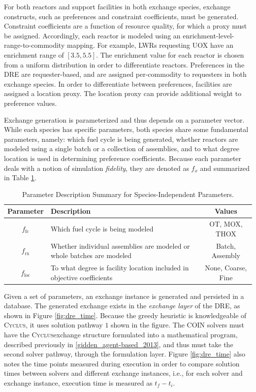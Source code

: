 \documentclass{anstrans}
\newcommand{\Cyclus}{\textsc{Cyclus}}
\newcommand{\ffc}{$f_{\text{fc}}$}
\newcommand{\frx}{$f_{\text{rx}}$}
\newcommand{\floc}{$f_{\text{loc}}$}
\begin{document}
For both reactors and support facilities in both exchange species, exchange
constructs, such as preferences and constraint coefficients, must be
generated. Constraint coefficients are a function of resource quality, for which
a proxy must be assigned. Accordingly, each reactor is modeled using an
enrichment-level-range-to-commodity mapping. For example, LWRs requesting UOX
have an enrichment range of $[3.5, 5.5]$. The enrichment value for each reactor
is chosen from a uniform distribution in order to differentiate
reactors. Preferences in the DRE are requester-based, and are assigned
per-commodity to requesters in both exchange species. In order to differentiate
between preferences, facilities are assigned a location proxy. The location
proxy can provide additional weight to preference values.

Exchange generation is parameterized and thus depends on a parameter
vector. While each species has specific parameters, both species share some
fundamental parameters, namely: which fuel cycle is being generated, whether
reactors are modeled using a single batch or a collection of assemblies, and to
what degree location is used in determining preference coefficients. Because
each parameter deals with a notion of simulation \textit{fidelity}, they are
denoted as $f_{x}$ and summarized in Table \ref{tbl:global_params}.

\begin{table}[h!]
\centering
\caption{Parameter Description Summary for Species-Independent Parameters.}
\label{tbl:global_params}
\begin{tabularx}{\columnwidth}{|c|X|c|} %
\hline
Parameter    & 
Description & 
Values
\\ \hline
\ffc      &
Which fuel cycle is being modeled &
OT, MOX, THOX
\\ \hline
\frx    &
Whether individual assemblies are modeled or whole batches are modeled &
Batch, Assembly  
\\ \hline
\floc     &
To what degree is facility location included in objective coefficients &
None, Coarse, Fine
\\ \hline
\end{tabularx}
\end{table}

Given a set of parameters, an exchange instance is generated and persisted in a
database. The generated exchange exists in the \textit{exchange layer} of the
DRE, as shown in Figure \ref{fig:dre_time}. Because the greedy heuristic is
knowledgeable of \Cyclus, it uses solution pathway $1$ shown in the figure. The
COIN solvers must have the \Cyclus exchange structure formulated into a
mathematical program, described previously in \ref{gidden_agent-based_2013}, and
thus must take the second solver pathway, through the formulation layer. Figure
\ref{fig:dre_time} also notes the time points measured during execution in order
to compare solution times between solvers and different exchange instances,
i.e., for each solver and exchange instance, execution time is measured as $t_f
- t_i$.
\end{document}
